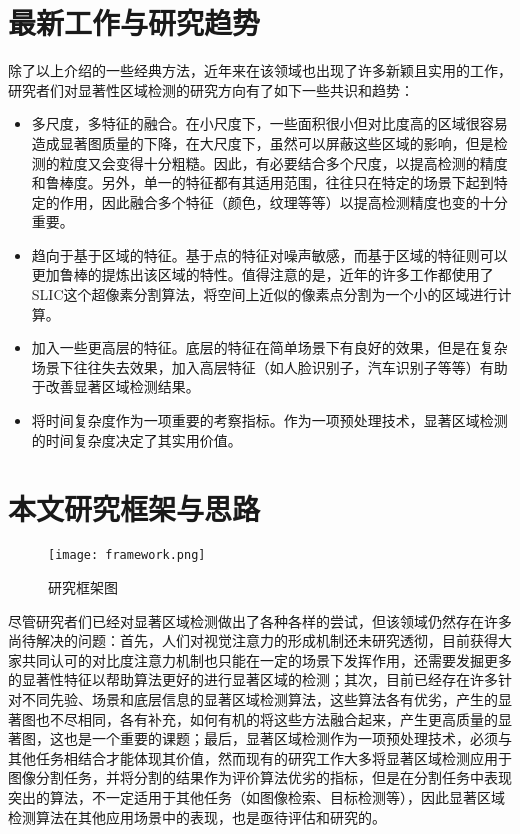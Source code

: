 \section{最新工作与研究趋势}
除了以上介绍的一些经典方法，近年来在该领域也出现了许多新颖且实用的工作\cite{borji2012salient}\cite{yan2013hierarchical}\cite{shi2013pisa}\cite{wei2012geodesic}，研究者们对显著性区域检测的研究方向有了如下一些共识和趋势：
\begin{itemize}
\item 多尺度，多特征的融合。在小尺度下，一些面积很小但对比度高的区域很容易造成显著图质量的下降，在大尺度下，虽然可以屏蔽这些区域的影响，但是检测的粒度又会变得十分粗糙。因此，有必要结合多个尺度，以提高检测的精度和鲁棒度。另外，单一的特征都有其适用范围，往往只在特定的场景下起到特定的作用，因此融合多个特征（颜色，纹理等等）以提高检测精度也变的十分重要。
\item 趋向于基于区域的特征。基于点的特征对噪声敏感，而基于区域的特征则可以更加鲁棒的提炼出该区域的特性。值得注意的是，近年的许多工作都使用了SLIC\cite{achanta2010slic}这个超像素分割算法，将空间上近似的像素点分割为一个小的区域进行计算。
\item 加入一些更高层的特征。底层的特征在简单场景下有良好的效果，但是在复杂场景下往往失去效果，加入高层特征（如人脸识别子，汽车识别子等等）有助于改善显著区域检测结果。
\item 将时间复杂度作为一项重要的考察指标。作为一项预处理技术，显著区域检测的时间复杂度决定了其实用价值。
\end{itemize}

\section{本文研究框架与思路}
\begin{figure}[h]
\centering
\texttt{[image: framework.png]}
\caption{研究框架图} \label{fig:framework}
\end{figure}

尽管研究者们已经对显著区域检测做出了各种各样的尝试，但该领域仍然存在许多尚待解决的问题：首先，人们对视觉注意力的形成机制还未研究透彻，目前获得大家共同认可的对比度注意力机制也只能在一定的场景下发挥作用，还需要发掘更多的显著性特征以帮助算法更好的进行显著区域的检测；其次，目前已经存在许多针对不同先验、场景和底层信息的显著区域检测算法，这些算法各有优劣，产生的显著图也不尽相同，各有补充，如何有机的将这些方法融合起来，产生更高质量的显著图，这也是一个重要的课题；最后，显著区域检测作为一项预处理技术，必须与其他任务相结合才能体现其价值，然而现有的研究工作大多将显著区域检测应用于图像分割任务，并将分割的结果作为评价算法优劣的指标，但是在分割任务中表现突出的算法，不一定适用于其他任务（如图像检索、目标检测等），因此显著区域检测算法在其他应用场景中的表现，也是亟待评估和研究的。

